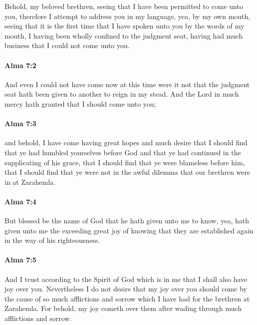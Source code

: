			Behold, my beloved brethren,
			seeing that I have been permitted to come unto you,
			therefore I attempt to address you in my language,
			yea, by my own mouth,
			seeing that it is the first time
			that I have spoken unto you by the words of my mouth,
			I having been wholly confined to the judgment seat,
			having had much business that I could not come unto you.

		\paragraph{Alma 7:2} %
			\label{ALMA-7-2}

			And even I could not have come now at this time
			were it not that the judgment seat hath been given to another
			to reign in my stead.
			And the Lord in much mercy hath granted that I should come unto you;

		\paragraph{Alma 7:3} %
			\label{ALMA-7-3}

			and behold, I have come having great hopes and much desire
			that I should find that ye had humbled yourselves before God
			and that ye had continued in the supplicating of his grace,
			that I should find that ye were blameless before him,
			that I should find that ye were not in the awful dilemma
			that our brethren were in at Zarahemla.

		\paragraph{Alma 7:4} %
			\label{ALMA-7-4}

			But blessed be the name of God that he hath given unto me to know,
			yea, hath given unto me the exceeding great joy of knowing
			that they are established again in the way of his righteousness.

		\paragraph{Alma 7:5} %
			\label{ALMA-7-5}

			And I trust according to the Spirit of God which is in me
			that I shall also have joy over you.
			Nevertheless I do not desire
			that my joy over you should come
			by the cause of so much afflictions and sorrow
			which I have had for the brethren at Zarahemla.
			For behold, my joy cometh over them
			after wading through much afflictions and sorrow.

